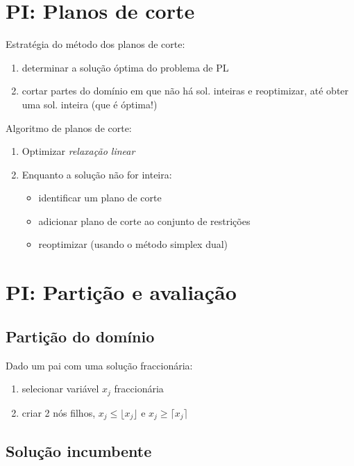 \documentclass[10pt, a4paper]{article}
\begin{document}
\begin{multicols}{2}
\section{PI: Planos de corte}

Estratégia do método dos planos de corte:
\begin{enumerate}
    \item determinar a solução óptima do problema de PL
    \item cortar partes do domínio em que não há sol. inteiras e reoptimizar, até obter uma sol. inteira (que é óptima!)
\end{enumerate}

Algoritmo de planos de corte:
\begin{enumerate}
    \item Optimizar \textit{relaxação linear}
    \item Enquanto a solução não for inteira:
    \begin{itemize}
        \item identificar um plano de corte
        \item adicionar plano de corte ao conjunto de restrições
        \item reoptimizar (usando o método simplex dual)
    \end{itemize}
\end{enumerate}



\section{PI: Partição e avaliação}

\subsection{Partição do domínio}

Dado um pai com uma solução fraccionária:
\begin{enumerate}
    \item selecionar variável \(x_j\) fraccionária
    \item criar 2 nós filhos, \(x_j \le \lfloor x_j \rfloor\) e \(x_j \ge \lceil x_j \rceil \)
\end{enumerate}

\subsection{Solução incumbente}


\end{multicols}
\end{document}
